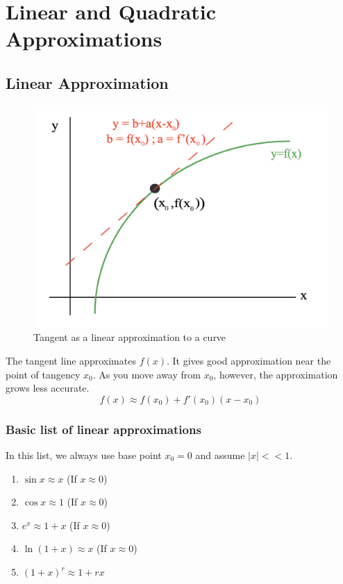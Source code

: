 

\chapter{Linear and Quadratic Approximations}

\bigbreak
\section{Linear Approximation}

\begin{figure}[ht!]
	\centering        
	\includegraphics[scale=0.5]{./images/lecture_7_figure_1.png}
	\caption{Tangent as a linear approximation to a curve}
\end{figure}

The tangent line approximates $f(x)$. It gives good approximation near the point of tangency $x_0$.
As you move away from $x_0$, however, the approximation grows less accurate.
$$\boxed{ f(x) \approx f(x_0) + f'(x_0)(x-x_0) } $$

\subsection{Basic list of linear approximations}

In this list, we always use base point $x_0 = 0$ and assume $|x|<<1$.
\begin{enumerate}
	\item $\sin x	\approx x$ (If $x \approx 0$)
	\item $\cos x	\approx 1$ (If $x \approx 0$)
	\item $e ^ x	\approx 1 + x$ (If $x \approx 0$)
	\item $\ln(1+x)	\approx x$ (If $x \approx 0$)
	\item $(1+x)^r	\approx 1+rx$
\end{enumerate}

